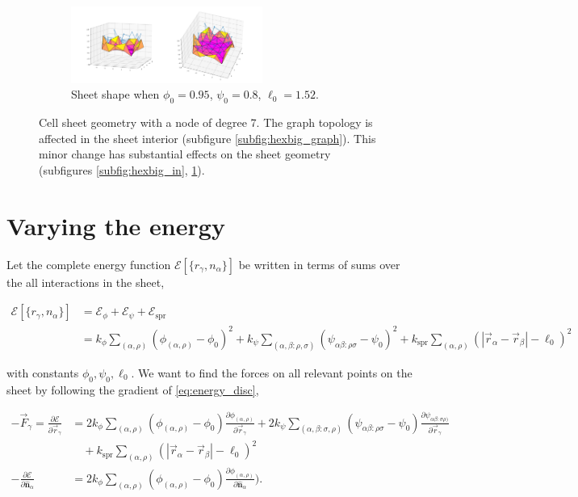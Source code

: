 \documentclass[draft]{article}
\newcommand{\e}{\mathcal{E}}
\newcommand{\bhat}[1]{\hat{\bm{#1}}}
\begin{document}
\begin{figure}[htbp]
\begin{subfigure}[b]{\textwidth}
        \includegraphics[width=0.69\textwidth]{figures/numerical/hexbig/hexbig0.95_0.8_1.35_10_plot.png}
        \caption{Sheet shape when $\phi_0=0.95$, $\psi_0=0.8$, $\ell_0=1.52$.}
        \label{subfig:hexbig_out}
    \end{subfigure}
    \caption{Cell sheet geometry with a node of degree 7. The graph topology is affected in the sheet interior (subfigure \ref{subfig:hexbig_graph}). This minor change has substantial effects on the sheet geometry (subfigures \ref{subfig:hexbig_in}, \ref{subfig:hexbig_out}).}
    \label{fig:hexbig}
\end{figure}

\section{Varying the energy}

Let the complete energy function $\e[\{r_\gamma, n_\alpha\}]$ be written in terms of sums over the all interactions in the sheet,

\begin{align}
	\e[\{r_\gamma, n_\alpha\}] &= \e_\phi + \e_\psi + \e_{\text{spr}} \label{eq:energy_disc_simple} \\
	&= k_\phi \sum_{(\alpha, \rho)} \left( \phi_{(\alpha, \rho)} - \phi_0 \right)^2 + k_\psi \sum_{(\alpha, \beta: \rho, \sigma)} \left( \psi_{\alpha\beta:\rho\sigma} - \psi_0 \right)^2 + k_{\text{spr}} \sum_{(\alpha, \rho)} \left(\left| \vec{r}_\alpha - \vec{r}_\beta \right| - \ell_0 \right)^2 \label{eq:energy_disc}
\end{align}

\noindent with constants $\phi_0, \psi_0, \ell_0$. We want to find the forces on all relevant points on the sheet by following the gradient of \ref{eq:energy_disc}, 

\begin{align}
	-\vec{F}_\gamma = \frac{\partial \e}{\partial \vec{r}_\gamma} &= 2k_\phi \sum_{(\alpha, \rho)} \left( \phi_{(\alpha,\rho)} - \phi_0 \right) \frac{\partial \phi_{(\alpha,\rho)}}{\partial \vec{r}_\gamma} + 2 k_\psi \sum_{(\alpha, \beta: \sigma, \rho)} \left( \psi_{\alpha\beta:\rho\sigma} - \psi_0 \right) \frac{\partial \psi_{\alpha\beta:\sigma\rho)}}{\partial \vec{r}_\gamma} \nonumber \\
	&\quad + k_{\text{spr}} \sum_{(\alpha, \rho)} \left(\left| \vec{r}_\alpha - \vec{r}_\beta \right| - \ell_0 \right)^2 \label{eq:energy_disc_deriv1} \\
	-\frac{\partial \e}{\partial \bhat{n}_\alpha} &= 2k_\phi \sum_{(\alpha, \rho)} \left( \phi_{(\alpha,\rho)} - \phi_0\right) \frac{\partial \phi_{(\alpha, \rho)}}{\partial \bhat{n}_\alpha}). \label{eq:energy_disc_deriv2}
\end{align}
\end{document}
